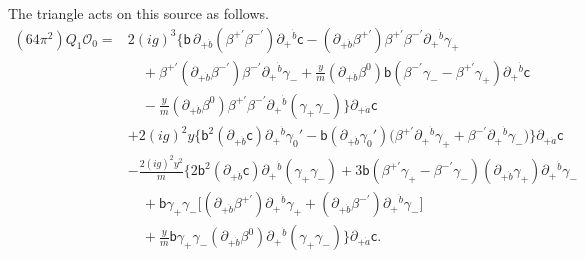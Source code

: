 \documentclass[11pt]{article}
\numberwithin{equation}{section}
\numberwithin{figure}{section}
\numberwithin{table}{section}
\begin{document}
\begin{proofbox}
The triangle acts on this source as follows.
\begin{equation}\label{eq-SQEDoneaction}
\begin{aligned}
(64\pi^2)Q_1\mathcal O_0
={}&2(ig)^3\Big\{
 \mathsf b\,\partial_{+\dot b}(\beta^{+\prime}\beta^{-\prime})
                    \partial_+{}^{\dot b}\mathsf c
 -(\partial_{+\dot b}\beta^{+\prime})\beta^{+\prime}\beta^{-\prime}
                    \partial_+{}^{\dot b}\gamma_+\\
&\quad+\beta^{+\prime}(\partial_{+\dot b}\beta^{-\prime})\beta^{-\prime}
                    \partial_+{}^{\dot b}\gamma_-
 +\frac ym(\partial_{+\dot b}\beta^0)\mathsf b
   (\beta^{-\prime}\gamma_--\beta^{+\prime}\gamma_+)
                    \partial_+{}^{\dot b}\mathsf c\\
&\quad-\frac ym(\partial_{+\dot b}\beta^0)\beta^{+\prime}\beta^{-\prime}
                    \partial_+{}^{\dot b}(\gamma_+\gamma_-)
 \Big\}\partial_{+\dot a}\mathsf c\\
&+2(ig)^2y\Big\{
 \mathsf b^2(\partial_{+\dot b}\mathsf c)
                    \partial_+{}^{\dot b}\gamma_0'
 -\mathsf b(\partial_{+\dot b}\gamma_0')
   \bigl(\beta^{+\prime}\partial_+{}^{\dot b}\gamma_+
        +\beta^{-\prime}\partial_+{}^{\dot b}\gamma_-\bigr)
 \Big\}\partial_{+\dot a}\mathsf c\\
&-\frac{2(ig)^2y^2}{m}\Big\{
 2\mathsf b^2(\partial_{+\dot b}\mathsf c)
                    \partial_+{}^{\dot b}(\gamma_+\gamma_-)
 +3\mathsf b(\beta^{+\prime}\gamma_+-\beta^{-\prime}\gamma_-)
       (\partial_{+\dot b}\gamma_+)\partial_+{}^{\dot b}\gamma_-\\
&\quad+\mathsf b\gamma_+\gamma_-
  \bigl[(\partial_{+\dot b}\beta^{+\prime})\partial_+{}^{\dot b}\gamma_+
       +(\partial_{+\dot b}\beta^{-\prime})\partial_+{}^{\dot b}\gamma_-\bigr]\\
&\quad+\frac ym\mathsf b\gamma_+\gamma_-
       (\partial_{+\dot b}\beta^0)\partial_+{}^{\dot b}(\gamma_+\gamma_-)
 \Big\}\partial_{+\dot a}\mathsf c .
\end{aligned}
\end{equation}


\end{proofbox}
\end{document}
